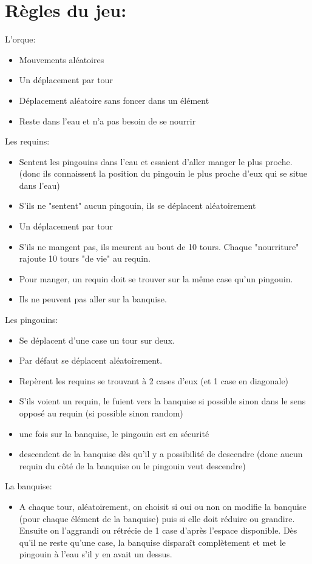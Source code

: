 \documentclass[12pt]{article}
\begin{document}
{\section{Règles du jeu:}
	L'orque:
	\begin{itemize}
		\item Mouvements aléatoires
		\item Un déplacement par tour
		\item Déplacement aléatoire sans foncer dans un élément
		\item Reste dans l'eau et n'a pas besoin de se nourrir
	\end{itemize}	
	Les requins:
	\begin{itemize}
		\item Sentent les pingouins dans l'eau et essaient d'aller manger le plus proche. (donc ils connaissent la position du pingouin le plus proche d'eux qui se situe dans l'eau)
		\item S'ils ne "sentent" aucun pingouin, ils se déplacent aléatoirement
		\item Un déplacement par tour
		\item S'ils ne mangent pas, ils meurent au bout de 10 tours. Chaque "nourriture" rajoute 10 tours "de vie" au requin.
		\item Pour manger, un requin doit se trouver sur la même case qu'un pingouin.
		\item Ils ne peuvent pas aller sur la banquise.
	\end{itemize}
\newpage
	Les pingouins:
	\begin{itemize}
		\item Se déplacent d'une case un tour sur deux.
		\item Par défaut se déplacent aléatoirement.
		\item Repèrent les requins se trouvant à 2 cases d'eux (et 1 case en diagonale)
		\item S'ils voient un requin, le fuient vers la banquise si possible sinon dans le sens opposé au requin (si possible sinon random)
		\item une fois sur la banquise, le pingouin est en sécurité
		\item descendent de la banquise dès qu'il y a possibilité de descendre (donc aucun requin du côté de la banquise ou le pingouin veut descendre)
	\end{itemize}
	La banquise:
	\begin{itemize}
		\item A chaque tour, aléatoirement, on choisit si oui ou non on modifie la banquise (pour chaque élément de la banquise) puis si elle doit réduire ou grandire. Ensuite on l'aggrandi ou rétrécie de 1 case d'après l'espace disponible. Dès qu'il ne reste qu'une case, la banquise disparaît complètement et met le pingouin à l'eau s'il y en avait un dessus.
	\end{itemize}

}
\end{document}
